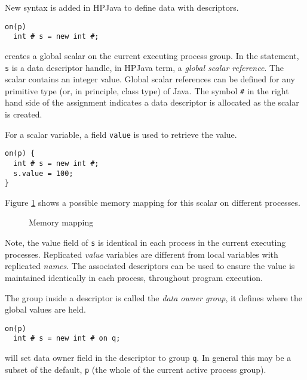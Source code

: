 New syntax is added in HPJava to define data with descriptors.
\small
\begin{verbatim}
on(p)
  int # s = new int #;
\end{verbatim}
\normalsize
creates a global scalar on the current executing process group. In the
statement, \texttt{s} is a data descriptor handle, in HPJava term, a
\emph{global scalar reference}.  The scalar contains an integer value.
Global scalar references can be defined for any primitive type (or,
in principle, class type) of Java.
The symbol \texttt{\#} in the right hand side of the assignment
indicates a data descriptor is allocated as the scalar is created.

For a scalar variable, a field \texttt{value} is used to retrieve the
value.
\small
\begin{verbatim}
on(p) {
  int # s = new int #;
  s.value = 100;
}
\end{verbatim}
\normalsize
Figure \ref{fig:mapping} shows a possible memory mapping for this
scalar on different processes. 
\begin{figure}[htbp]
  \begin{center}
    \leavevmode
    \caption{Memory mapping}
    \label{fig:mapping}
  \end{center}
\end{figure}
Note, the value field of \texttt{s} is identical in each process in the
current executing processes.   Replicated {\em value} variables are
different from local variables with replicated {\em names}.  The
associated descriptors can be used to ensure the value is maintained
identically in each process, throughout program execution.

The group inside a descriptor is called the \emph{data owner group}, it
defines where the global values are held.
\small
\begin{verbatim}
on(p)
  int # s = new int # on q;
\end{verbatim}
\normalsize
will set data owner field in the descriptor to group \texttt{q}.  In
general this may be a subset of the default, \texttt{p} (the whole
of the current active process group).


